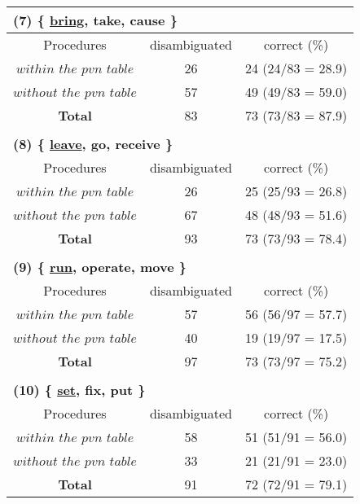 {\footnotesize
\begin{table}[htbp]
\begin{center}
\begin{tabular}{c||c|c} 
\multicolumn{3}{l}{\bf{(7) \{ \underline{bring}, take, cause \}}} \\
\hline \hline
Procedures &disambiguated &correct (\%)  \\ \hline \hline
$within$ $the$ $pvn$ $table$ &\hspace*{1mm}26  &24 (24/83 = 28.9) \\ \hline
$without$ $the$ $pvn$ $table$ &57 &49 (49/83 = 59.0) \\ \hline
{\bf Total} &83  &73 (73/83 = 87.9)  \\ \hline
\multicolumn{3}{c}{} \\
\multicolumn{3}{l}{\bf{(8) \{ \underline{leave}, go, receive \}}} \\
\hline \hline
Procedures  &disambiguated &correct (\%) \\ \hline \hline
$within$ $the$ $pvn$ $table$  &\hspace*{1mm}26  &25 (25/93 = 26.8) \\ \hline
$without$ $the$ $pvn$ $table$ &67 &48 (48/93 = 51.6) \\ \hline
{\bf Total} &93 &73 (73/93 = 78.4) \\ \hline
\multicolumn{3}{c}{} \\
\multicolumn{3}{l}{\bf{(9) \{ \underline{run}, operate, move \}}} \\
\hline \hline
Procedures  &disambiguated &correct (\%) \\ \hline \hline
$within$ $the$ $pvn$ $table$  &\hspace*{1mm}57  &56 (56/97 = 57.7) \\ \hline
$without$ $the$ $pvn$ $table$  &40 &19 (19/97 = 17.5) \\ \hline
{\bf Total} &97  &73 (73/97 = 75.2)  \\ \hline
\multicolumn{3}{c}{} \\
\multicolumn{3}{l}{\bf{(10) \{ \underline{set}, fix, put \}}} \\
\hline \hline
Procedures  &disambiguated &correct (\%)  \\ \hline \hline
$within$ $the$ $pvn$ $table$ &\hspace*{1mm}58  &51 (51/91 = 56.0) \\ \hline
$without$ $the$ $pvn$ $table$ &33 &21 (21/91 = 23.0) \\ \hline
{\bf Total} &91  &72 (72/91 = 79.1) \\ \hline

\end{tabular}
\end{center}
\end{table}}
